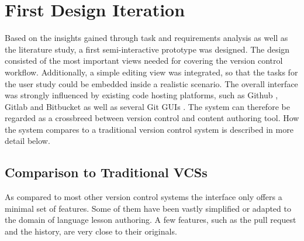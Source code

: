 \chapter{First Design Iteration} \label{chapter:design-first-iteration}
Based on the insights gained through task and requirements analysis as well as the literature study, a first semi-interactive prototype was designed. The design consisted of the most important views needed for covering the version control workflow. Additionally, a simple editing view was integrated, so that the tasks for the user study could be embedded inside a realistic scenario. The overall interface was strongly influenced by existing code hosting platforms, such as Github \cite{_about_????}, Gitlab \cite{_code_????} and Bitbucket \cite{_bitbucket_????} as well as several Git GUIs \cite{_git_????}. The system can therefore be regarded as a crossbreed between version control and content authoring tool. How the system compares to a traditional version control system is described in more detail below.

\section{Comparison to Traditional VCSs} \label{sec:git-feature-comparison}
As compared to most other version control systems the interface only offers a minimal set of features. Some of them have been vastly simplified or adapted to the domain of language lesson authoring. A few features, such as the pull request and the history, are very close to their originals.

